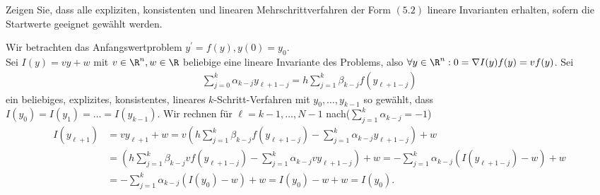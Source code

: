 \begin{exercise}
  Zeigen Sie, dass alle expliziten, konsistenten und linearen
  Mehrschrittverfahren der Form $(5.2)$ lineare Invarianten
  erhalten, sofern die Startwerte geeignet gewählt werden.
\end{exercise}

\begin{solution}
  Wir betrachten das Anfangswertproblem $y^{\prime} = f(y), y(0) = y_0$. \\
  Sei $I(y) = vy + w$ mit $v \in \R^n, w \in \R$ beliebige eine lineare Invariante
  des Problems, also $\forall y \in \R^n: 0 = \nabla I(y)f(y) = vf(y)$.
  Sei
  \begin{align*}
    \sum_{j=0}^k \alpha_{k-j}y_{\ell+1-j} = h\sum_{j=1}^k \beta_{k-j}f(y_{\ell+1-j})
  \end{align*}
  ein beliebiges, explizites, konsistentes, lineares $k$-Schritt-Verfahren mit
  $y_0,\dots,y_{k-1}$ so gewählt, dass \\
   $I(y_0) = I(y_1) = \dots = I(y_{k-1})$.
  Wir rechnen für $\ell = k-1,\dots,N-1$ nach($\sum_{j=1}^k \alpha_{k-j} = -1$)
  \begin{align*}
    I(y_{\ell+1}) &= vy_{\ell + 1} + w = v\left(h\sum_{j=1}^k \beta_{k-j}f(y_{\ell+1-j}) - \sum_{j=1}^k \alpha_{k-j}y_{\ell+1-j}\right) + w \\
    &= \left(h\sum_{j=1}^k \beta_{k-j}vf(y_{\ell+1-j}) - \sum_{j=1}^k \alpha_{k-j}vy_{\ell+1-j}\right) + w
    = -\sum_{j=1}^k \alpha_{k-j}\left(I(y_{\ell+1-j}) - w\right) + w \\
    &= -\sum_{j=1}^k \alpha_{k-j}\left(I(y_0) - w\right) + w
    = I(y_0) - w + w = I(y_0).
  \end{align*}
\end{solution}
